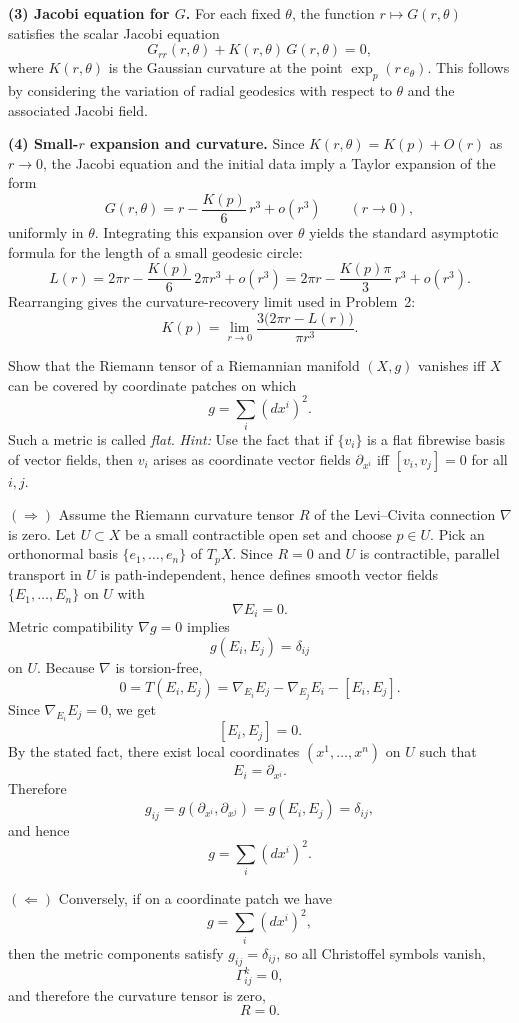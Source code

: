 \begin{solution}
\medskip
\noindent\textbf{(3) Jacobi equation for \(G\).}
For each fixed \(\theta\), the function \(r\mapsto G(r,\theta)\) satisfies the scalar
Jacobi equation
\[
G_{rr}(r,\theta)+K(r,\theta)\,G(r,\theta)=0,
\]
where \(K(r,\theta)\) is the Gaussian curvature at the point \(\exp_{p}(r\,e_{\theta})\).
This follows by considering the variation of radial geodesics with respect to \(\theta\)
and the associated Jacobi field.

\medskip
\noindent\textbf{(4) Small-\(r\) expansion and curvature.}
Since \(K(r,\theta)=K(p)+O(r)\) as \(r\to 0\), the Jacobi equation and the initial data imply
a Taylor expansion of the form
\[
G(r,\theta)=r-\frac{K(p)}{6}\,r^{3}+o(r^{3}) \qquad (r\to 0),
\]
uniformly in \(\theta\). Integrating this expansion over \(\theta\) yields the standard
asymptotic formula for the length of a small geodesic circle:
\[
L(r)=2\pi r-\frac{K(p)}{6}\,2\pi r^{3}+o(r^{3})
=2\pi r-\frac{K(p)\pi}{3}\,r^{3}+o(r^{3}).
\]
Rearranging gives the curvature-recovery limit used in Problem~2:
\[
K(p)=\lim_{r\to 0}\frac{3\bigl(2\pi r-L(r)\bigr)}{\pi r^{3}}.
\]


\bigskip
\end{solution}

\begin{problem}
\label{prob:cp-vii-0076}
Show that the Riemann tensor of a Riemannian manifold $(X,g)$ vanishes iff $X$ can be covered by coordinate patches on which
\[
g=\sum_i (dx^i)^2.
\]
Such a metric is called \emph{flat}.
\textit{Hint:} Use the fact that if $\{v_i\}$ is a flat fibrewise basis of vector fields, then $v_i$ arises as coordinate vector fields $\partial_{x^i}$ iff $[v_i,v_j]=0$ for all $i,j$.
\end{problem}

\begin{solution}
$(\Rightarrow)$ Assume the Riemann curvature tensor $R$ of the Levi--Civita connection $\nabla$ is zero.
Let $U\subset X$ be a small contractible open set and choose $p\in U$.
Pick an orthonormal basis $\{e_1,\dots,e_n\}$ of $T_pX$.
Since $R=0$ and $U$ is contractible, parallel transport in $U$ is path-independent, hence defines smooth vector fields
$\{E_1,\dots,E_n\}$ on $U$ with
\[
\nabla E_i=0.
\]
Metric compatibility $\nabla g=0$ implies
\[
g(E_i,E_j)=\delta_{ij}
\]
on $U$.
Because $\nabla$ is torsion-free,
\[
0=T(E_i,E_j)=\nabla_{E_i}E_j-\nabla_{E_j}E_i-[E_i,E_j].
\]
Since $\nabla_{E_i}E_j=0$, we get
\[
[E_i,E_j]=0.
\]
By the stated fact, there exist local coordinates $(x^1,\dots,x^n)$ on $U$ such that
\[
E_i=\partial_{x^i}.
\]
Therefore
\[
g_{ij}=g(\partial_{x^i},\partial_{x^j})=g(E_i,E_j)=\delta_{ij},
\]
and hence
\[
g=\sum_i (dx^i)^2.
\]

$(\Leftarrow)$ Conversely, if on a coordinate patch we have
\[
g=\sum_i (dx^i)^2,
\]
then the metric components satisfy $g_{ij}=\delta_{ij}$, so all Christoffel symbols vanish,
\[
\Gamma^k_{ij}=0,
\]
and therefore the curvature tensor is zero,
\[
R=0.
\]
\end{solution}


